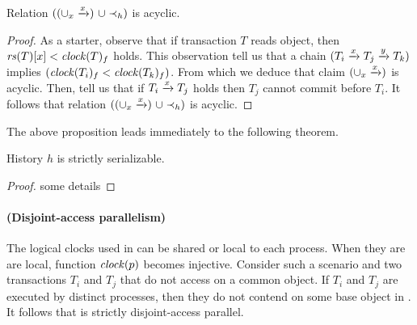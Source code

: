 \begin{proposition}  
  Relation $((\union_{x} \stmPrec{x}) ~\union \hb_h)$ is acyclic.
\end{proposition}

\begin{proof}
  As a starter, observe that if transaction $T$ reads object, then $\readSetOf{T}[x] < \clockOf{T}_f$ holds.
  This observation tell us that a chain $(T_i \stmPrec{x} T_j \stmPrec{y} T_k)$ implies $(\clockOf{T_i}_f < \clockOf{T_k}_f)$.
  From which we deduce that claim $(\union_{x} \stmPrec{x})$ is acyclic.
  Then,  tell us that if $T_i \stmPrec{x} T_j$ holds then $T_j$ cannot commit before $T_i$.
  It follows that relation $((\union_{x} \stmPrec{x}) ~\union \hb_h)$ is acyclic.  
\end{proof}

The above proposition leads immediately to the following theorem.

\begin{theorem}
  History $h$ is strictly serializable.
\end{theorem}

\begin{proof}
  some details
\end{proof}

\paragraph{(Disjoint-access parallelism)}
The logical clocks used in  can be shared or local to each process.
When they are are local, function $\clockOf{p}$ becomes injective.
Consider such a scenario and two transactions $T_i$ and $T_j$ that do not access on a common object.
If $T_i$ and $T_j$ are executed by distinct processes, then they do not contend on some base object in .
It follows that  is strictly disjoint-access parallel.

